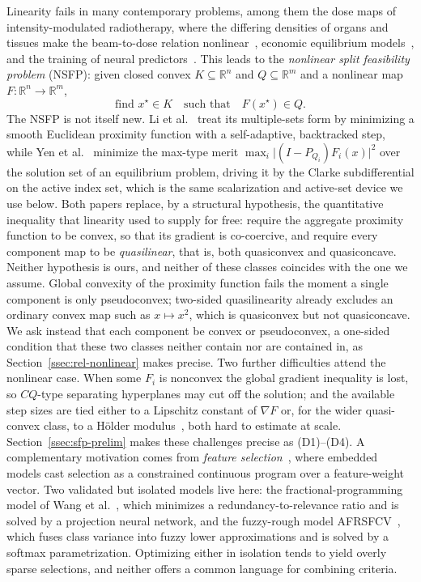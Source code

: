 \documentclass[]{interact}
\theoremstyle{plain}
\theoremstyle{definition}
\theoremstyle{remark}
\newcommand{\R}{\mathbb{R}}
\begin{document}
Linearity fails in many contemporary problems, among them the dose maps of intensity-modulated radiotherapy, where the differing densities of organs and tissues make the beam-to-dose relation nonlinear~\citep{li2013nsfp}, economic equilibrium models~\citep{yen2019}, and the training of neural predictors~\citep{tuan2024}. This leads to the \emph{nonlinear split feasibility problem} (NSFP): given closed convex $K\subseteq\R^n$ and $Q\subseteq\R^m$ and a nonlinear map $F:\R^n\to\R^m$,
\begin{equation}\label{eq:nsfp-intro}
\text{find } x^\star\in K \quad\text{such that}\quad F(x^\star)\in Q .
\end{equation}
The NSFP is not itself new. Li et al.~\citep{li2013nsfp} treat its multiple-sets form by minimizing a smooth Euclidean proximity function with a self-adaptive, backtracked step, while Yen et al.~\citep{yen2019} minimize the max-type merit $\max_i\lvert(I-P_{Q_i})F_i(x)\rvert^2$ over the solution set of an equilibrium problem, driving it by the Clarke subdifferential on the active index set, which is the same scalarization and active-set device we use below. Both papers replace, by a structural hypothesis, the quantitative inequality that linearity used to supply for free: \citep{li2013nsfp} require the aggregate proximity function to be convex, so that its gradient is co-coercive, and \citep{yen2019} require every component map to be \emph{quasilinear}, that is, both quasiconvex and quasiconcave. Neither hypothesis is ours, and neither of these classes coincides with the one we assume. Global convexity of the proximity function fails the moment a single component is only pseudoconvex; two-sided quasilinearity already excludes an ordinary convex map such as $x\mapsto x^2$, which is quasiconvex but not quasiconcave. We ask instead that each component be convex or pseudoconvex, a one-sided condition that these two classes neither contain nor are contained in, as Section~\ref{ssec:rel-nonlinear} makes precise. Two further difficulties attend the nonlinear case. When some $F_i$ is nonconvex the global gradient inequality is lost, so $CQ$-type separating hyperplanes may cut off the solution; and the available step sizes are tied either to a Lipschitz constant of $\nabla F$ or, for the wider quasi-convex class, to a H\"older modulus~\citep{hu2022quasi}, both hard to estimate at scale. Section~\ref{ssec:sfp-prelim} makes these challenges precise as (D1)--(D4). A complementary motivation comes from \emph{feature selection}~\citep{guyon2003,theng2024fs}, where embedded models cast selection as a constrained continuous program over a feature-weight vector. Two validated but isolated models live here: the fractional-programming model of Wang et al.~\citep{wang2021fractional}, which minimizes a redundancy-to-relevance ratio and is solved by a projection neural network, and the fuzzy-rough model AFRSFCV~\citep{wang2026afrsfcv}, which fuses class variance into fuzzy lower approximations and is solved by a softmax parametrization. Optimizing either in isolation tends to yield overly sparse selections, and neither offers a common language for combining criteria.
\end{document}
